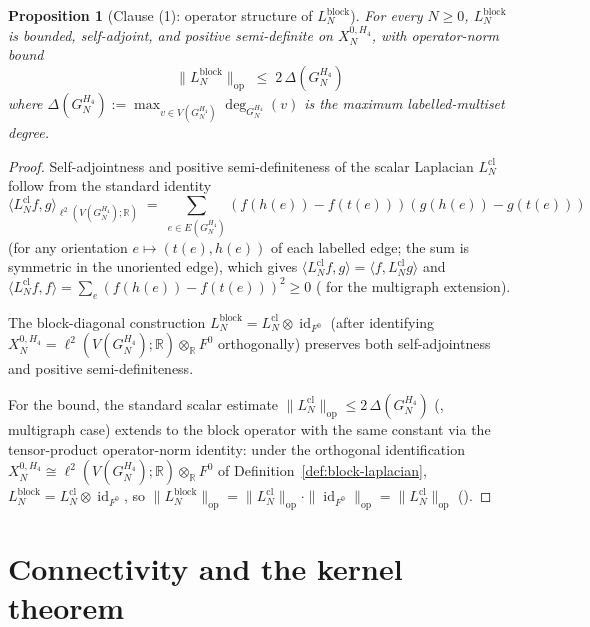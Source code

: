 \documentclass[11pt]{article}
\newcommand{\R}{\mathbb{R}}
\newcommand{\op}{\mathrm{op}}
\newcommand{\id}{\operatorname{id}}
\newtheorem{proposition}[theorem]{Proposition}
\theoremstyle{definition}
\begin{document}
\begin{proposition}[Clause (1): operator structure of
$L_N^{\mathrm{block}}$]
\label{prop:psd}
For every $N \geq 0$, $L_N^{\mathrm{block}}$ is bounded,
self-adjoint, and positive semi-definite on $X_N^{0, H_4}$, with
operator-norm bound
\[
  \|L_N^{\mathrm{block}}\|_{\op}
  \;\leq\; 2 \, \Delta(G_N^{H_4})
\]
where $\Delta(G_N^{H_4}) := \max_{v \in V(G_N^{H_4})}
\deg_{G_N^{H_4}}(v)$ is the maximum labelled-multiset degree.
\end{proposition}

\begin{proof}
Self-adjointness and positive semi-definiteness of the scalar
Laplacian $L^{\mathrm{cl}}_N$ follow from the standard identity
\[
  \langle L^{\mathrm{cl}}_N f, g \rangle_{\ell^2(V(G_N^{H_4}); \R)}
  \;=\; \sum_{e \in E(G_N^{H_4})}
        (f(h(e)) - f(t(e))) (g(h(e)) - g(t(e)))
\]
(for any orientation $e \mapsto (t(e), h(e))$ of each labelled
edge; the sum is symmetric in the unoriented edge), which gives
$\langle L^{\mathrm{cl}}_N f, g\rangle = \langle f,
L^{\mathrm{cl}}_N g\rangle$ and
$\langle L^{\mathrm{cl}}_N f, f\rangle = \sum_e (f(h(e)) -
f(t(e)))^{2} \geq 0$ (\cite[Ch.~1]{Chung} for the multigraph
extension).

The block-diagonal construction
$L_N^{\mathrm{block}} = L^{\mathrm{cl}}_N \otimes \id_{F^0}$
(after identifying $X_N^{0, H_4} = \ell^2(V(G_N^{H_4}); \R)
\otimes_{\R} F^0$ orthogonally) preserves both self-adjointness
and positive semi-definiteness.

For the bound, the standard scalar estimate
$\|L^{\mathrm{cl}}_N\|_{\op} \leq 2 \, \Delta(G_N^{H_4})$
(\cite[Ch.~1]{Chung}, multigraph case) extends to the block
operator with the same constant via the tensor-product
operator-norm identity: under the orthogonal identification
$X_N^{0, H_4} \cong \ell^2(V(G_N^{H_4}); \R) \otimes_{\R} F^{0}$
of Definition~\ref{def:block-laplacian}, $L_N^{\mathrm{block}} =
L^{\mathrm{cl}}_N \otimes \id_{F^{0}}$, so
$\|L_N^{\mathrm{block}}\|_{\op} = \|L^{\mathrm{cl}}_N\|_{\op}
\cdot \|\id_{F^{0}}\|_{\op} = \|L^{\mathrm{cl}}_N\|_{\op}$
(\cite[Ch.~4.2]{HornJohnson}).
\end{proof}

\section{Connectivity and the kernel theorem}
\label{sec:kernel}
\end{document}
